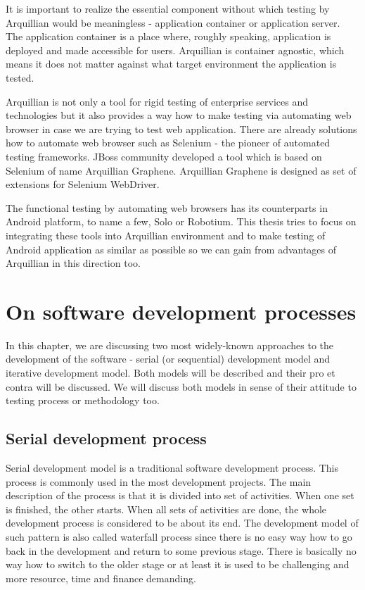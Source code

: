 \documentclass[12pt,final,oneside]{fithesis}
\begin{document}
It is important to realize the essential component without which testing by Arquillian would be meaningless - application container or application server. The application container is a place where, roughly speaking, application is deployed and made accessible for users. Arquillian is container agnostic, which means it does not matter against what target environment the application is tested.

Arquillian is not only a tool for rigid testing of enterprise services and technologies but it also provides a way how to make testing via automating web browser in case we are trying to test web application. There are already solutions how to automate web browser such as Selenium - the pioneer of automated testing frameworks. JBoss community developed a tool which is based on Selenium of name Arquillian Graphene. Arquillian Graphene is designed as set of extensions for Selenium WebDriver.

The functional testing by automating web browsers has its counterparts in Android platform, to name a few, Solo or Robotium. This thesis tries to focus on integrating these tools into Arquillian environment and to make testing of Android application as similar as possible so we can gain from advantages of Arquillian in this direction too. 

\chapter{On software development processes}

In this chapter, we are discussing two most widely-known approaches to the development of the software - serial (or sequential) development model and iterative development model. Both models will be described and their pro et contra will be discussed. We will discuss both models in sense of their attitude to testing process or methodology too.

	\section{Serial development process}
Serial development model is a traditional software development process. This process is commonly used in the most development projects. The main description of the process is that it is divided into set of activities. When one set is finished, the other starts. When all sets of activities are done, the whole development process is considered to be about its end. The development model of such pattern is also called waterfall process since there is no easy way how to go back in the development and return to some previous stage. There is basically no way how to switch to the older stage or at least it is used to be challenging and more resource, time and finance demanding.
\end{document}
